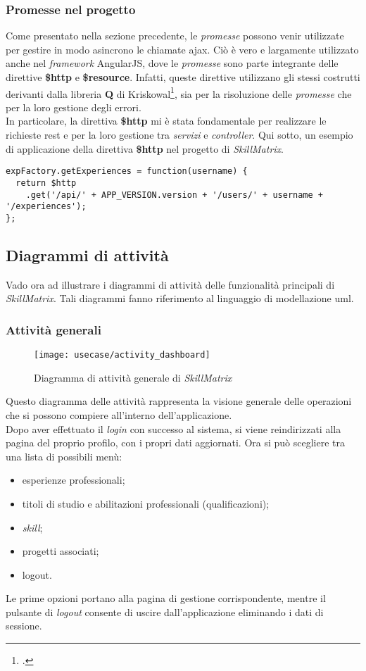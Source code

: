 \subsubsection{Promesse nel progetto}
Come presentato nella sezione precedente, le \emph{promesse} possono venir utilizzate per gestire in modo asincrono le chiamate \gls{ajax}. Ciò è vero e largamente utilizzato anche nel \emph{framework} AngularJS, dove le \emph{promesse} sono parte integrante delle direttive \textbf{\$http} e \textbf{\$resource}. Infatti, queste direttive utilizzano gli stessi costrutti derivanti dalla libreria \textbf{Q} di Kriskowal\footcite{site:q}, sia per la risoluzione delle \emph{promesse} che per la loro gestione degli errori.\\
In particolare, la direttiva \textbf{\$http} mi è stata fondamentale per realizzare le richieste \gls{rest} e per la loro gestione tra \emph{servizi} e \emph{controller}. Qui sotto, un esempio di applicazione della direttiva \textbf{\$http} nel progetto di \emph{SkillMatrix}.
\begin{verbatim}
expFactory.getExperiences = function(username) {
  return $http
    .get('/api/' + APP_VERSION.version + '/users/' + username + '/experiences');
};
\end{verbatim}

\subsection{Diagrammi di attività}
Vado ora ad illustrare i diagrammi di attività delle funzionalità principali di \emph{SkillMatrix}. Tali diagrammi fanno riferimento al linguaggio di modellazione \gls{uml}.

\subsubsection{Attività generali}
\begin{figure}[!ht] 
    \centering 
    \texttt{[image: usecase/activity\_dashboard]} 
    \caption{Diagramma di attività generale di \emph{SkillMatrix}}
\end{figure}
Questo diagramma delle attività rappresenta la visione generale delle operazioni che si possono compiere all'interno dell'applicazione.\\
Dopo aver effettuato il \emph{login} con successo al sistema, si viene reindirizzati alla pagina del proprio profilo, con i propri dati aggiornati. Ora si può scegliere tra una lista di possibili menù:
\begin{itemize}
	\item esperienze professionali;
	\item titoli di studio e abilitazioni professionali (qualificazioni);
	\item \emph{skill};
	\item progetti associati;
	\item logout.
\end{itemize}
Le prime opzioni portano alla pagina di gestione corrispondente, mentre il pulsante di \emph{logout} consente di uscire dall'applicazione eliminando i dati di sessione.

